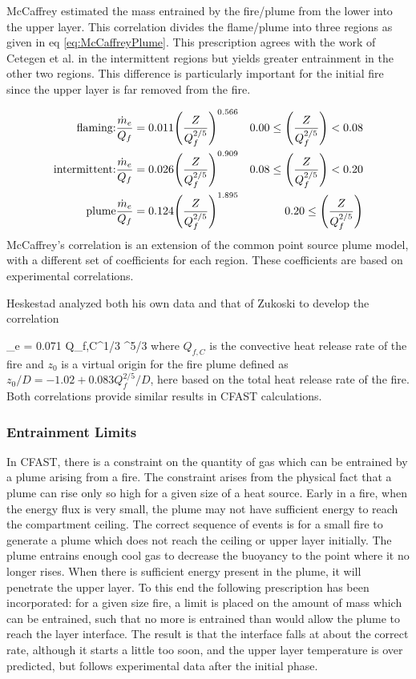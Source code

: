 McCaffrey \cite{McCaffrey:1983} estimated the mass entrained by the fire/plume from the lower into the upper layer. This correlation divides the flame/plume into three regions as
given in eq \ref{eq:McCaffreyPlume}.  This prescription agrees with the work of Cetegen et al. \cite{Cetegen:1982, Cetegen:1984} in the intermittent regions but yields greater entrainment in the other two regions.  This difference is particularly important for the initial fire since the upper layer is far removed from the fire.

\begin{eqnarray}
\textnormal{flaming:} & \frac{\dot{m}_e}{Q_f} = 0.011 { \left( {\frac{Z}{Q_f^{2/5}}} \right) }^{0.566} & 0.00 \leq { \left( {\frac{Z}{Q_f^{2/5}}} \right) }<0.08 \nonumber \\
\textnormal{intermittent:} & \frac{\dot{m}_e}{Q_f} = 0.026 { \left( {\frac{Z}{Q_f^{2/5}}} \right) }^{0.909} & 0.08 \leq { \left( {\frac{Z}{Q_f^{2/5}}} \right) }<0.20 \label{eq:McCaffreyPlume} \\
\textnormal{plume} & \frac{\dot{m}_e}{Q_f} = 0.124 { \left( {\frac{Z}{Q_f^{2/5}}} \right) }^{1.895} & 0.20 \leq { \left( {\frac{Z}{Q_f^{2/5}}} \right) } \nonumber
\end{eqnarray}
McCaffrey's correlation is an extension of the common point source plume model, with a
different set of coefficients for each region. These coefficients are based on experimental correlations.

Heskestad  analyzed both his own data \cite{Heskestad:1984} and that of Zukoski \cite{Zukoski:1981} to develop the correlation

\be {}_e = 0.071 Q_{f,C}^{1/3} ^{5/3}  \ee
where $Q_{f,C}$ is the convective heat release rate of the fire and $z_0$ is a virtual origin for the fire plume defined as $z_0/D = -1.02 + 0.083 Q_f^{2/5} / D$, here based on the total heat release rate of the fire.  Both correlations provide similar results in CFAST calculations.

\subsubsection{Entrainment Limits}

In CFAST, there is a constraint on the quantity of gas which can be entrained by a plume arising
from a fire.  The constraint arises from the physical fact that a plume can rise only so high for a given size of a heat source.  Early in a fire, when the energy flux is very small, the plume may
not have sufficient energy to reach the compartment ceiling. The correct sequence of events is
for a small fire to generate a plume which does not reach the ceiling or upper layer initially.  The
plume entrains enough cool gas to decrease the buoyancy to the point where it no longer rises.
When there is sufficient energy present in the plume, it will penetrate the upper layer.  To this
end the following prescription has been incorporated:  for a given size fire, a limit is placed on
the amount of mass which can be entrained, such that no more is entrained than would allow the
plume to reach the layer interface.  The result is that the interface falls at about the correct rate,
although it starts a little too soon, and the upper layer temperature is over predicted, but follows
experimental data after the initial phase.

